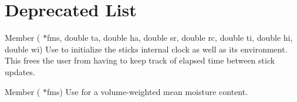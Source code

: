 \chapter{Deprecated List}
\hypertarget{deprecated}{}\label{deprecated}

\begin{DoxyRefList}
\item[Member \doxylink{newfms_8h_a0035dbf066e9f5486fc3f81dd7c337a6}{Fms\+\_\+\+Initialize} (\doxylink{struct_fms}{Fms} \texorpdfstring{$\ast$}{*}fms, double ta, double ha, double sr, double rc, double ti, double hi, double wi)]\label{deprecated__deprecated000001}%
%
Use  to initialize the stick\textquotesingle{}s internal clock as well as its environment. This frees the user from having to keep track of elapsed time between stick updates. 
\item[Member \doxylink{newfms_8h_ac4fa4cca704c055303f78f5273d5f006}{Fms\+\_\+\+Mean\+Moisture} (\doxylink{struct_fms}{Fms} \texorpdfstring{$\ast$}{*}fms)]\label{deprecated__deprecated000002}%
%
Use  for a volume-\/weighted mean moisture content. 
\end{DoxyRefList}